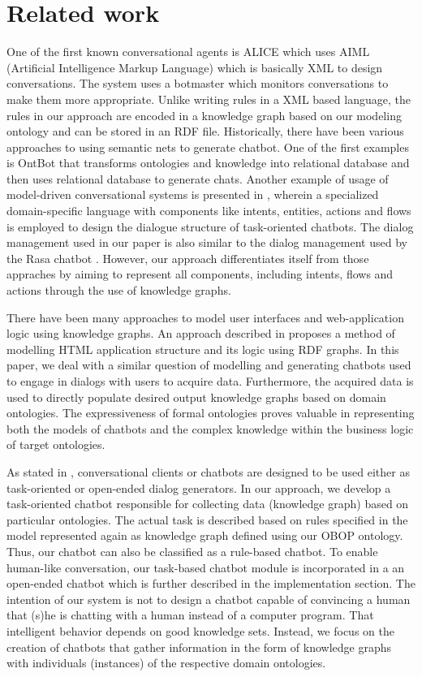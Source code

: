 \documentclass[runningheads]{llncs}
\begin{document}
\section{Related work}
One of the first known conversational agents is ALICE \cite{wallace2009anatomy} which uses AIML (Artificial Intelligence Markup Language) which is basically XML to design conversations. The system uses a botmaster which monitors conversations to make them more appropriate. Unlike writing rules in a XML based language, the rules in our approach are encoded in a knowledge graph based on our modeling ontology and can be stored in an RDF file. Historically, there have been various approaches to using semantic nets to generate chatbot. One of the first examples is OntBot \cite{al2011ontbot} that transforms ontologies and knowledge into relational database and then uses relational database to generate chats. Another example of usage of model-driven conversational systems is presented in \cite{perez2020model}, wherein a specialized domain-specific language with components like intents, entities, actions and flows is employed to design the dialogue structure of task-oriented chatbots. The dialog management used in our paper is also similar to the dialog management used by the Rasa chatbot \cite{bocklisch2017rasa}. However, our approach differentiates itself from those appraches by aiming to represent all components, including intents, flows and actions through the use of knowledge graphs. 

There have been many approaches to model user interfaces and web-application logic using knowledge graphs. An approach described in \cite{rutesic2021enhanced} proposes a method of modelling HTML application structure and its logic using RDF graphs.
In this paper, we deal with a similar question of modelling and generating chatbots used to engage in dialogs with users to acquire data. Furthermore, the acquired data is used to directly populate desired output knowledge graphs based on domain ontologies. The expressiveness of formal ontologies proves valuable in representing both the models of chatbots and the complex knowledge within the business logic of target ontologies.

As stated in \cite{agarwal2020review}, conversational clients or chatbots are designed to be used either as task-oriented or open-ended dialog generators. In our approach, we develop a task-oriented chatbot responsible for collecting data (knowledge graph) based on particular ontologies. The actual task is described based on rules specified in the model represented again as knowledge graph defined using our OBOP ontology. Thus, our chatbot can also be classified as a rule-based chatbot. To enable human-like conversation, our task-based chatbot module is incorporated in a an open-ended chatbot which is further described in the implementation section. The intention of our system is not to design a chatbot capable of convincing a human that (s)he is chatting with a human instead of a computer program. That intelligent behavior depends on good knowledge sets. Instead, we focus on the creation of chatbots that gather information in the form of knowledge graphs with individuals (instances) of the respective domain ontologies.  
\end{document}
